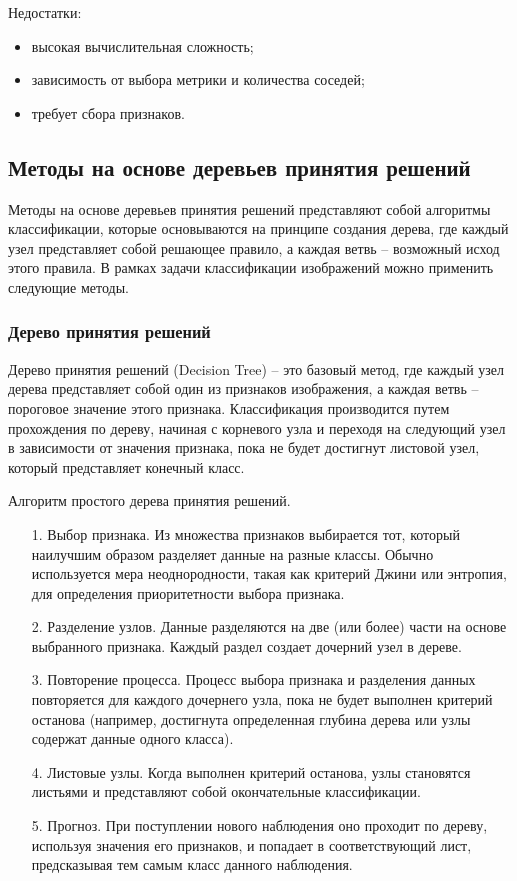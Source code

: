 Недостатки:
\begin{itemize}[leftmargin=1.6\parindent, label*=---]
	\item высокая вычислительная сложность;
	\item зависимость от выбора метрики и количества соседей;
	\item требует сбора признаков.
\end{itemize}

\subsection{Методы на основе деревьев принятия решений}

Методы на основе деревьев принятия решений представляют собой алгоритмы классификации, которые основываются на принципе создания дерева, где каждый узел представляет собой решающее правило, а каждая ветвь -- возможный исход этого правила. В рамках задачи классификации изображений можно применить следующие методы.

\subsubsection*{Дерево принятия решений}

Дерево принятия решений (Decision Tree) -- это базовый метод, где каждый узел дерева представляет собой один из признаков изображения, а каждая ветвь -- пороговое значение этого признака. Классификация производится путем прохождения по дереву, начиная с корневого узла и переходя на следующий узел в зависимости от значения признака, пока не будет достигнут листовой узел, который представляет конечный класс.

Алгоритм простого дерева принятия решений.
\begin{itemize}[leftmargin=1.6\parindent]
	\item[1.] Выбор признака. Из множества признаков выбирается тот, который наилучшим образом разделяет данные на разные классы. Обычно используется мера неоднородности, такая как критерий Джини\cite{gini-index} или энтропия, для определения приоритетности выбора признака.
	\item[2.] Разделение узлов. Данные разделяются на две (или более) части на основе выбранного признака. Каждый раздел создает дочерний узел в дереве.
	\item[3.] Повторение процесса. Процесс выбора признака и разделения данных повторяется для каждого дочернего узла, пока не будет выполнен критерий останова (например, достигнута определенная глубина дерева или узлы содержат данные одного класса).
	\item[4.] Листовые узлы. Когда выполнен критерий останова, узлы становятся листьями и представляют собой окончательные классификации.
	\item[5.] Прогноз. При поступлении нового наблюдения оно проходит по дереву, используя значения его признаков, и попадает в соответствующий лист, предсказывая тем самым класс данного наблюдения.
\end{itemize}

